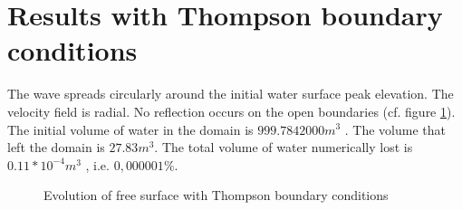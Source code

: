 \section{Results with Thompson boundary conditions}

The wave spreads circularly around the initial water surface peak elevation.
The velocity field is radial. No reflection occurs on the open boundaries (cf. figure \ref{t2d:gouttedo:thompson_evol}).
The initial volume of water in the domain is $999.784 2000 m^3$ . The volume that left the domain is $27.83 m^3$.
The total volume of water numerically lost is $0.11* 10^{-4} m^3$ , i.e. $0,000001\%$.

\begin{figure}[H]
\begin{minipage}[t]{0.50\textwidth}
 \centering
\end{minipage}%
\begin{minipage}[t]{0.50\textwidth}
 \centering
\end{minipage}
\begin{minipage}[t]{0.50\textwidth}
 \centering
\end{minipage}%
\begin{minipage}[t]{0.50\textwidth}
 \centering
\end{minipage}
\begin{minipage}[t]{0.50\textwidth}
 \centering
\end{minipage}%
\begin{minipage}[t]{0.50\textwidth}
 \centering
\end{minipage}
\begin{minipage}[t]{0.50\textwidth}
 \centering
\end{minipage}%
\begin{minipage}[t]{0.50\textwidth}
 \centering
\end{minipage}
\caption{Evolution of free surface with Thompson boundary conditions}
\label{t2d:gouttedo:thompson_evol}
\end{figure}


